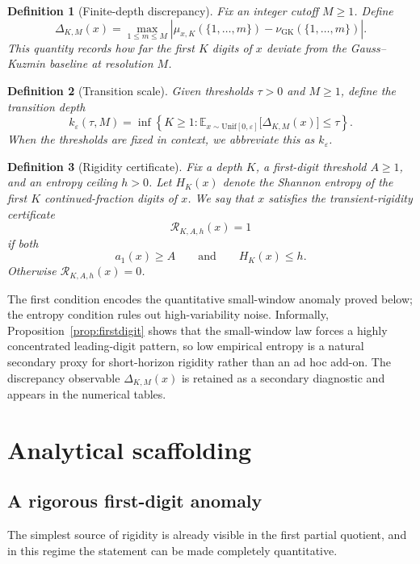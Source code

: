 \documentclass[11pt]{article}
\newtheorem{definition}{Definition}[section]
\begin{document}
\begin{definition}[Finite-depth discrepancy]
Fix an integer cutoff $M \ge 1$. Define
\[
\Delta_{K,M}(x)=\max_{1\le m\le M}\left|\mu_{x,K}(\{1,\dots,m\})-\nu_{\mathrm{GK}}(\{1,\dots,m\})\right|.
\]
This quantity records how far the first $K$ digits of $x$ deviate from the Gauss--Kuzmin baseline at resolution $M$.
\end{definition}

\begin{definition}[Transition scale]
Given thresholds $\tau>0$ and $M\ge1$, define the transition depth
\[
k_{\varepsilon}(\tau,M)
=
\inf\left\{K\ge1: \mathbb{E}_{x\sim \mathrm{Unif}[0,\varepsilon]}\big[\Delta_{K,M}(x)\big]\le \tau\right\}.
\]
When the thresholds are fixed in context, we abbreviate this as $k_{\varepsilon}$.
\end{definition}

\begin{definition}[Rigidity certificate]
Fix a depth $K$, a first-digit threshold $A\ge1$, and an entropy ceiling $h>0$. Let $H_K(x)$ denote the Shannon entropy of the first $K$ continued-fraction digits of $x$. We say that $x$ satisfies the transient-rigidity certificate
\[
\mathcal{R}_{K,A,h}(x)=1
\]
if both
\[
a_1(x)\ge A
\qquad\text{and}\qquad
H_K(x)\le h.
\]
Otherwise $\mathcal{R}_{K,A,h}(x)=0$.
\end{definition}

The first condition encodes the quantitative small-window anomaly proved below; the entropy condition rules out high-variability noise. Informally, Proposition~\ref{prop:firstdigit} shows that the small-window law forces a highly concentrated leading-digit pattern, so low empirical entropy is a natural secondary proxy for short-horizon rigidity rather than an ad hoc add-on. The discrepancy observable $\Delta_{K,M}(x)$ is retained as a secondary diagnostic and appears in the numerical tables.

\section{Analytical scaffolding}

\subsection{A rigorous first-digit anomaly}

The simplest source of rigidity is already visible in the first partial quotient, and in this regime the statement can be made completely quantitative.
\end{document}
